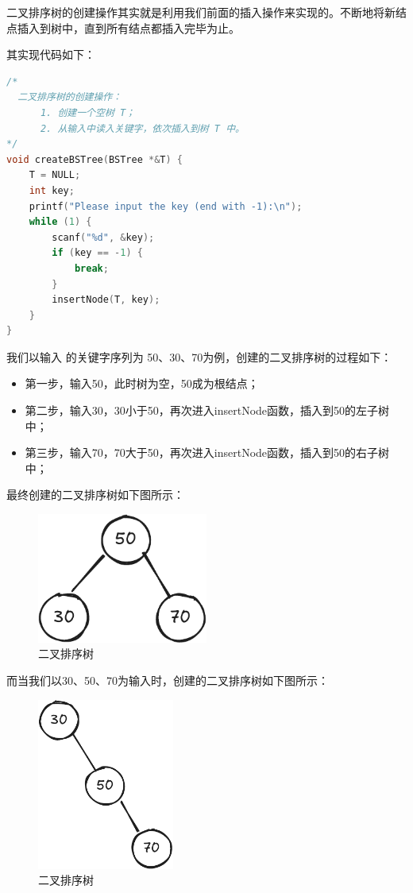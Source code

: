 \documentclass[lang=cn,newtx,10pt,scheme=chinese]{elegantbook}
\begin{document}
二叉排序树的创建操作其实就是利用我们前面的插入操作来实现的。不断地将新结点插入到树中，直到所有结点都插入完毕为止。

其实现代码如下：

\begin{lstlisting}[language=C++, caption={二叉排序树的创建操作}]
  /*
  二叉排序树的创建操作：
      1. 创建一个空树 T；
      2. 从输入中读入关键字，依次插入到树 T 中。
*/
void createBSTree(BSTree *&T) {
    T = NULL;
    int key;
    printf("Please input the key (end with -1):\n");
    while (1) {
        scanf("%d", &key);
        if (key == -1) {
            break;
        }
        insertNode(T, key);
    }
}
\end{lstlisting}

我们以输入 的关键字序列为 50、30、70为例，创建的二叉排序树的过程如下：

\begin{itemize}
  \item 第一步，输入50，此时树为空，50成为根结点；
  \item 第二步，输入30，30小于50，再次进入insertNode函数，插入到50的左子树中；
  \item 第三步，输入70，70大于50，再次进入insertNode函数，插入到50的右子树中；
  \end{itemize}
最终创建的二叉排序树如下图所示：

\begin{figure}[h!]
  \centering
  \includegraphics[width=0.5\textwidth]{./figure/pdf/cropped/bsTree.pdf}
  \caption{二叉排序树}
  \label{fig:bstree}
\end{figure}

而当我们以30、50、70为输入时，创建的二叉排序树如下图所示：

\begin{figure}[h!]
  \centering
  \includegraphics[width=0.4\textwidth]{./figure/pdf/cropped/bsTree2.pdf}
  \caption{二叉排序树}
  \label{fig:bstree2}
\end{figure}
\end{document}
